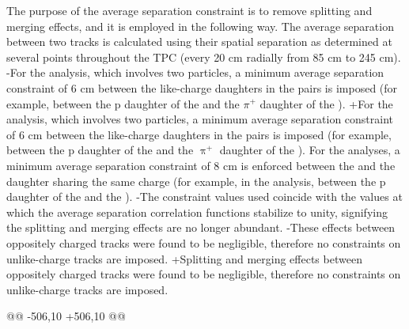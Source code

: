  The purpose of the average separation constraint is to remove splitting and merging effects, and it is employed in the following way.  
 The average separation between two tracks is calculated using their spatial separation as determined at several points throughout the TPC (every 20 cm radially from 85 cm to 245 cm).
-For the \LamKs analysis, which involves two \Vz particles, a minimum average separation constraint of 6 cm between the like-charge daughters in the pairs is imposed (for example, between the p daughter of the \Lam and the $\pi^{+}$ daughter of the \Ks).
+For the \LamKs analysis, which involves two \Vz particles, a minimum average separation constraint of 6 cm between the like-charge daughters in the pairs is imposed (for example, between the p daughter of the \Lam and the $\uppi^{+}$ daughter of the \Ks).
 For the \LamKpm analyses, a minimum average separation constraint of 8 cm is enforced between the \Kpm and the \Lam daughter sharing the same charge (for example, in the \LamKchP analysis, between the p daughter of the \Lam and the \KchP).
-The constraint values used coincide with the values at which the average separation correlation functions stabilize to unity, signifying the splitting and merging effects are no longer abundant.
-These effects between oppositely charged tracks were found to be negligible, therefore no constraints on unlike-charge tracks are imposed.
+Splitting and merging effects between oppositely charged tracks were found to be negligible, therefore no constraints on unlike-charge tracks are imposed.
 
@@ -506,10 +506,10 @@
